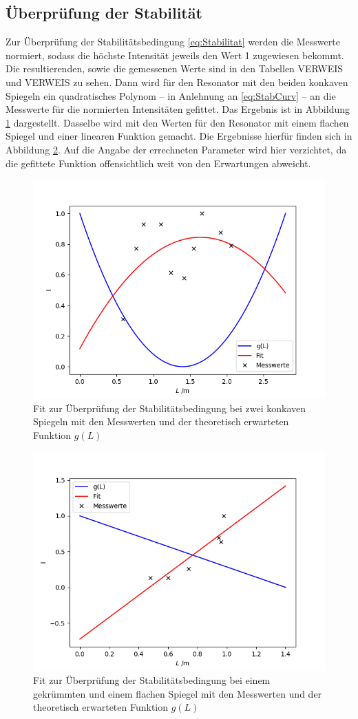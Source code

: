 \subsection{Überprüfung der Stabilität}
Zur Überprüfung der Stabilitätsbedingung \eqref{eq:Stabilitat} werden die Messwerte normiert, sodass die höchste Intensität jeweils den Wert 1 zugewiesen bekommt. Die resultierenden, sowie die gemessenen Werte sind in den Tabellen VERWEIS und VERWEIS zu sehen. Dann wird für den Resonator mit den beiden konkaven Spiegeln ein quadratisches Polynom -- in Anlehnung an \eqref{eq:StabCurv} -- an die Messwerte für die normierten Intensitäten gefittet. Das Ergebnis ist in Abbildung \ref{fig:fitcurved} dargestellt. Dasselbe wird mit den Werten für den Resonator mit einem flachen Spiegel und einer linearen Funktion gemacht. Die Ergebnisse hierfür finden sich in Abbildung \ref{fig:fitflat}. Auf die Angabe der errechneten Parameter wird hier verzichtet, da die gefittete Funktion offensichtlich weit von den Erwartungen abweicht.
\begin{figure}[h!]
	\centering
	\includegraphics[width=.6\textwidth]{FitCurved.png}
	\caption{Fit zur Überprüfung der Stabilitätsbedingung bei zwei konkaven Spiegeln mit den Messwerten und der theoretisch erwarteten Funktion $g(L)$}
	\label{fig:fitcurved}
\end{figure}
\begin{figure}[h!]
	\centering
	\includegraphics[width=.6\textwidth]{FitFlat.png}
	\caption{Fit zur Überprüfung der Stabilitätsbedingung bei einem gekrümmten und einem flachen Spiegel mit den Messwerten und der theoretisch erwarteten Funktion $g(L)$}
	\label{fig:fitflat}
\end{figure}
